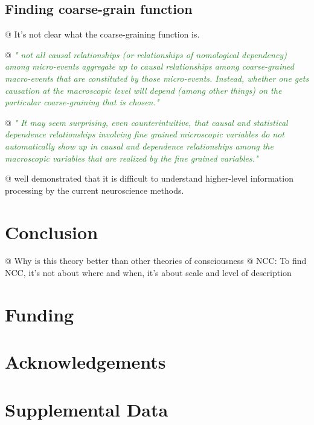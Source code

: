 \documentclass[utf8]{article}
\newenvironment{ants}
			{
			 \begin{easylist}[itemize]		
		 	}
			{
			\end{easylist}
			}
\newcommand{\rewrite}[1]{\textcolor{ForestGreen}{\textit{"#1"}}\newline}
\begin{document}
		\subsection{Finding coarse-grain function}
			\begin{ants}
				@ It's not clear what the coarse-graining function is.
				
				@ \rewrite{
					not all causal relationships (or relationships of nomological dependency) among micro-events aggregate up to causal relationships among coarse-grained macro-events that are constituted by those micro-events. Instead, whether one gets causation at the macroscopic level will depend (among other things) on the particular coarse-graining that is chosen.} \cite{price2007causation}
				
				@ \rewrite{
					It may seem surprising, even counterintuitive, that causal and statistical dependence relationships involving fine grained microscopic variables do not automatically show up in causal and dependence relationships among the macroscopic variables that are realized by the fine grained variables.} \cite{price2007causation}
				
				@ \cite{jonas2017could} well demonstrated that it is difficult to understand higher-level information processing by the current neuroscience methods. 
				
			\end{ants}
	
		

	\section{Conclusion}
		\begin{ants}
			@ Why is this theory better than other theories of consciousness
			@ NCC: To find NCC, it's not about where and when, it's about scale and level of description			 
		\end{ants}

	
	
	
	\section*{Funding}
	
	\section*{Acknowledgements}
	
	\section*{Supplemental Data}
	
	
	
	
	
	
\end{document}
